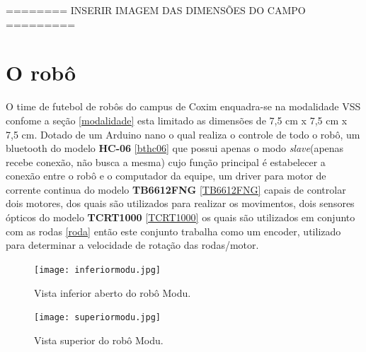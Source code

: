 \documentclass[a4paper,12pt,portuguese]{ufms-cpcx}
\begin{document}
======== INSERIR IMAGEM DAS DIMENSÕES DO CAMPO =========

\chapter{O robô}
O time de futebol de robôs do campus de Coxim enquadra-se na modalidade VSS confome a seção \ref{modalidade} esta limitado as dimensões de 7,5 cm x 7,5 cm x 7,5 cm. Dotado de um Arduino nano o qual realiza o controle de todo o robô, um bluetooth do modelo \textbf{HC-06} \ref{bthc06} que possui apenas o modo \textit{slave}(apenas recebe conexão, não busca a mesma) cujo função principal é estabelecer a conexão entre o robô e o computador da equipe, um driver para motor de corrente continua do modelo \textbf{TB6612FNG} \ref{TB6612FNG} capais de controlar dois motores, dos quais são utilizados para realizar os movimentos, dois sensores ópticos do modelo \textbf{TCRT1000} \ref{TCRT1000} os quais são utilizados em conjunto com as rodas \ref{roda} então este conjunto trabalha como um encoder, utilizado para determinar a velocidade de rotação das rodas/motor.
\begin{figure}[H]
	\centering
	\texttt{[image: inferiormodu.jpg]}
	\caption{Vista inferior aberto do robô Modu.}
\end{figure}
\begin{figure}[H]
	\centering
	\texttt{[image: superiormodu.jpg]}
	\caption{Vista superior do robô Modu.}
\end{figure}
\end{document}
